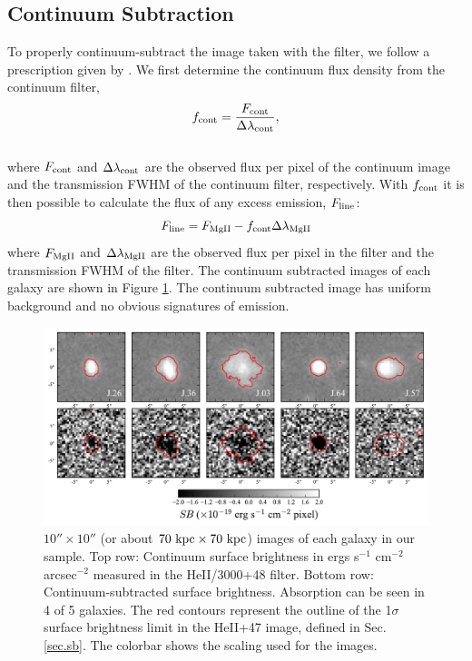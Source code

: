 \documentclass[twocolumn]{aastex61}
\begin{document}
\subsection{Continuum Subtraction}\label{subsec.cont_sub}

To properly continuum-subtract the image taken with the  filter, we follow a prescription given by \cite{Battaia_2015}. 
We first determine the continuum flux density from the continuum filter,
\begin{equation}
f_{\rm{cont}}=\frac{F_{\rm{cont}}}{\Delta \lambda_{\rm{cont}}},
\end{equation}\\
where $F_{\rm{cont}}$ and $\Delta \lambda_{\rm{cont}}$ are the observed flux per pixel of the continuum image and the transmission FWHM of the continuum filter, respectively. With $f_{\rm cont}$ it is then possible to calculate the flux of any excess emission, $F_{\rm{line}}$:
\begin{equation}
F_{\rm{line}}=F_{\rm{MgII}}-f_{\rm{cont}} \Delta \lambda_{\rm{MgII}}
\label{eq:subtraction}
\end{equation}
where $F_{\rm{MgII}}$ and $\Delta \lambda_{\rm MgII}$ are the observed flux per pixel in the  filter and the transmission FWHM of the  filter. The continuum subtracted images of each galaxy are shown in Figure \ref{fig:stamp_images}. The continuum subtracted image has uniform background and no obvious signatures of emission.

\begin{figure}[!htb]
\centering
\includegraphics[scale=0.7]{stamps.pdf}
\caption{ $10'' \times 10''$ (or about $70 \rm \ kpc \times 70 \rm \ kpc $) images of each galaxy in our sample. Top row: Continuum surface brightness in ergs s$^{-1}$ cm$^{-2}$ arcsec$^{-2}$ measured in the HeII/3000+48 filter. Bottom row: Continuum-subtracted  surface brightness.  Absorption can be seen in 4 of 5 galaxies. The red contours represent the outline of the 1$\sigma$ surface brightness limit in the HeII+47 image, defined in Sec. \ref{sec.sb}. The colorbar shows the scaling used for the  images.}
\label{fig:stamp_images}
\end{figure}
\end{document}
